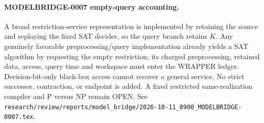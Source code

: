 \paragraph{MODELBRIDGE-0007 empty-query accounting.}
A broad restriction-service representation is implemented by retaining the
source and replaying the fixed SAT decider, so the query branch retains $K$.
Any genuinely favorable preprocessing/query implementation already yields a
SAT algorithm by requesting the empty restriction; its charged preprocessing,
retained data, access, query time and workspace must enter the WRAPPER ledger.
Decision-bit-only black-box access cannot recover a general service.  No
strict successor, contraction, or endpoint is added.  A fixed restricted
same-realization compiler and P versus NP remain OPEN.  See
\texttt{research/review/reports/model\_bridge/2026-10-11\_0900\_MODELBRIDGE-0007.tex}.
